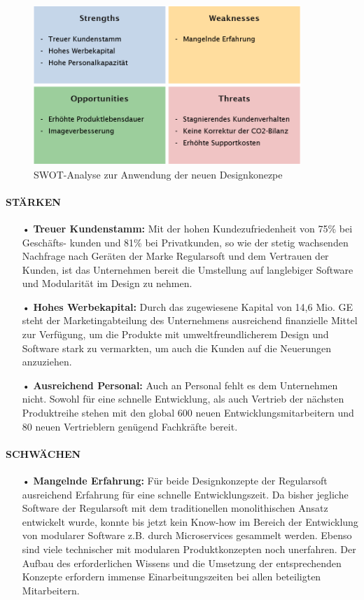 \documentclass[13pt,titlepage]{article}
\begin{document}
\begin{figure}[h]
 \centering
\includegraphics[width=0.9\textwidth]{SWOT}
 \caption{SWOT-Analyse zur Anwendung der neuen Designkonezpe}
 \label{fig:SWOT-Analyse}
\end{figure}

\paragraph{STÄRKEN}
\begin{itemize}
\item[•] \textbf{Treuer Kundenstamm:} 
Mit der hohen Kundezufriedenheit von 75\% bei Geschäfts- kunden und 81\% bei Privatkunden, so wie der stetig wachsenden Nachfrage nach Geräten der Marke Regularsoft und dem Vertrauen der Kunden, ist das Unternehmen bereit die Umstellung auf langlebiger Software und Modularität im Design zu nehmen.
\item[•] \textbf{Hohes Werbekapital:} 
Durch das zugewiesene Kapital  von 14,6 Mio. GE steht der Marketingabteilung des Unternehmens ausreichend finanzielle Mittel zur Verfügung, um die Produkte mit umweltfreundlicherem Design und Software stark zu vermarkten, um auch die Kunden auf die Neuerungen anzuziehen.
\item[•] \textbf{Ausreichend Personal:}
Auch an Personal fehlt es dem Unternehmen nicht. Sowohl für eine schnelle Entwicklung, als auch Vertrieb der nächsten Produktreihe stehen mit den global 600 neuen Entwicklungsmitarbeitern und 80 neuen Vertrieblern genügend Fachkräfte bereit.
\end{itemize}

\paragraph{SCHWÄCHEN}
\begin{itemize}
\item[•] \textbf{Mangelnde Erfahrung:}
Für beide Designkonzepte der Regularsoft ausreichend Erfahrung für eine schnelle Entwicklungszeit. Da bisher jegliche Software der Regularsoft mit dem traditionellen monolithischen Ansatz entwickelt wurde, konnte bis jetzt kein Know-how im Bereich der Entwicklung von modularer Software z.B. durch Microservices gesammelt werden. Ebenso sind viele technischer mit modularen Produktkonzepten noch unerfahren. Der Aufbau des erforderlichen Wissens und die Umsetzung der entsprechenden Konzepte erfordern immense Einarbeitungszeiten bei allen beteiligten Mitarbeitern.
\end{itemize}
\end{document}
